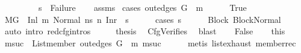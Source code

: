 \begin{isabellebody}
\ \ \ \ \ \ \ \ \ {\isachardoublequoteopen}s{\isacharprime}{\kern0pt}\ {\isasymnoteq}\ Failure{\isachardoublequoteclose}\isanewline
%
\isadelimproof
\ \ %
\endisadelimproof
%
\isatagproof
{}\isamarkupfalse%
\ assms\isanewline
{}\isamarkupfalse%
\ {\isacharparenleft}{\kern0pt}cases\ {\isachardoublequoteopen}{\isacharparenleft}{\kern0pt}out{\isacharunderscore}{\kern0pt}edges\ G{\isacharparenright}{\kern0pt}\ {\isacharbang}{\kern0pt}\ m\ {\isacharequal}{\kern0pt}\ {\isacharbrackleft}{\kern0pt}{\isacharbrackright}{\kern0pt}{\isachardoublequoteclose}{\isacharparenright}{\kern0pt}\isanewline
\ \ \isamarkupfalse%
\ True\isanewline
\ \ \isamarkupfalse%
\ {\isachardoublequoteopen}M{\isacharcomma}{\kern0pt}{\isasymLambda}{\isacharcomma}{\kern0pt}{\isasymGamma}{\isacharcomma}{\kern0pt}{\isasymOmega}{\isacharcomma}{\kern0pt}G\ {\isasymturnstile}\ {\isacharparenleft}{\kern0pt}Inl\ m{\isacharcomma}{\kern0pt}\ Normal\ ns{\isacharparenright}{\kern0pt}\ {\isacharminus}{\kern0pt}n{\isasymrightarrow}\ {\isacharparenleft}{\kern0pt}Inr\ {\isacharparenleft}{\kern0pt}{\isacharparenright}{\kern0pt}{\isacharcomma}{\kern0pt}\ s{\isacharprime}{\kern0pt}{\isacharparenright}{\kern0pt}{\isachardoublequoteclose}\isanewline
\ \ \ \ \isamarkupfalse%
\ {\isacharparenleft}{\kern0pt}cases\ s{\isacharprime}{\kern0pt}{\isacharparenright}{\kern0pt}\isanewline
\ \ \ \ \isamarkupfalse%
\ Block\ BlockNormal\isanewline
\ \ \ \ \isamarkupfalse%
\ {\isacharparenleft}{\kern0pt}auto\ intro{\isacharcolon}{\kern0pt}\ red{\isacharunderscore}{\kern0pt}cfg{\isachardot}{\kern0pt}intros{\isacharparenright}{\kern0pt}\isanewline
\ \ \isamarkupfalse%
\ \isamarkupfalse%
\ {\isacharquery}{\kern0pt}thesis\ \isamarkupfalse%
\ CfgVerifies\ \isamarkupfalse%
\ blast\isanewline
{}\isamarkupfalse%
\isanewline
\ \ \isamarkupfalse%
\ False\isanewline
\ \ \isamarkupfalse%
\ this\ \isamarkupfalse%
\ msuc\ \ {\isachardoublequoteopen}List{\isachardot}{\kern0pt}member\ {\isacharparenleft}{\kern0pt}out{\isacharunderscore}{\kern0pt}edges\ G\ {\isacharbang}{\kern0pt}\ m{\isacharparenright}{\kern0pt}\ msuc{\isachardoublequoteclose}\isanewline
\ \ \ \ \isamarkupfalse%
\ {\isacharparenleft}{\kern0pt}metis\ list{\isachardot}{\kern0pt}exhaust\ member{\isacharunderscore}{\kern0pt}rec{\isacharparenleft}{\kern0pt}{}{\isacharparenright}{\kern0pt}{\isacharparenright}{\kern0pt}\isanewline

\end{isabellebody}

